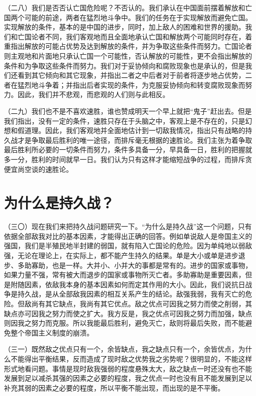 （二八）我们是否否认亡国危险呢？不否认的。我们承认在中国面前摆着解放和亡国两个可能的前途，两者在猛烈地斗争中。我们的任务在于实现解放而避免亡国。实现解放的条件，基本的是中国的进步，同时，加上敌人的困难和世界的援助。我们和亡国论者不同，我们客观地而且全面地承认亡国和解放两个可能同时存在，着重指出解放的可能占优势及达到解放的条件，并为争取这些条件而努力。亡国论者则主观地和片面地只承认亡国一个可能性，否认解放的可能性，更不会指出解放的条件和为争取这些条件而努力。我们对于妥协倾向和腐败现象也是承认的，但是我们还看到其它倾向和其它现象，并指出二者之中后者对于前者将逐步地占优势，二者在猛烈地斗争着；并指出后者实现的条件，为克服妥协倾向和转变腐败现象而努力。因此，我们并不悲观，而悲观的人们则与此相反。

（二九）我们也不是不喜欢速胜，谁也赞成明天一个早上就把“鬼子”赶出去。但是我们指出，没有一定的条件，速胜只存在于头脑之中，客观上是不存在的，只是幻想和假道理。因此，我们客观地并全面地估计到一切敌我情况，指出只有战略的持久战才是争取最后胜利的唯一途径，而排斥毫无根据的速胜论。我们主张为着争取最后胜利所必要的一切条件而努力，条件多具备一分，早具备一日，胜利的把握就多一分，胜利的时间就早一日。我们认为只有这样才能缩短战争的过程，而排斥贪便宜尚空谈的速胜论。

\section{为什么是持久战？}

（三〇）现在我们来把持久战问题研究一下。“为什么是持久战”这一个问题，只有依据全部敌我对比的基本因素，才能得出正确的回答。例如单说敌人是帝国主义的强国，我们是半殖民地半封建的弱国，就有陷入亡国论的危险。因为单纯地以弱敌强，无论在理论上，在实际上，都不能产生持久的结果。单是大小或单是进步退步、多助寡助，也是一样。大并小、小并大的事都是常有的。进步的国家或事物，如果力量不强，常有被大而退步的国家或事物所灭亡者。多助寡助是重要因素，但是附随因素，依敌我本身的基本因素如何而定其作用的大小。因此，我们说抗日战争是持久战，是从全部敌我因素的相互关系产生的结论。敌强我弱，我有灭亡的危险。但敌尚有其它缺点，我尚有其它优点。敌之优点可因我之努力而使之削弱，其缺点亦可因我之努力而使之扩大。我方反是，我之优点可因我之努力而加强，缺点则因我之努力而克服。所以我能最后胜利，避免灭亡，敌则将最后失败，而不能避免整个帝国主义制度的崩溃。

（三一）既然敌之优点只有一个，余皆缺点，我之缺点只有一个，余皆优点，为什么不能得出平衡结果，反而造成了现时敌之优势我之劣势呢？很明显的，不能这样形式地看问题。事情是现时敌我强弱的程度悬殊太大，敌之缺点一时还没有也不能发展到足以减杀其强的因素之必要的程度，我之优点一时也没有且不能发展到足以补充其弱的因素之必要的程度，所以平衡不能出现，而出现的是不平衡。

